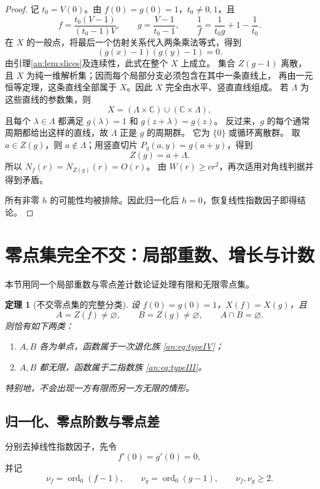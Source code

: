 \documentclass[11pt,a4paper,oneside,openany]{book}
\theoremstyle{lecture}
\newtheorem{theorem}{定理}[section]
\newcommand{\C}{\mathbb C}
\newcommand{\ord}{\operatorname{ord}}
\numberwithin{equation}{section}
\begin{document}
\begin{proof}
记 $t_0=V(0)$。由 $f(0)=g(0)=1$，$t_0\ne0,1$，且
\begin{equation}\label{an:eq:exceptionaffine}
 f=\frac{t_0(V-1)}{(t_0-1)V},\qquad
 g=\frac{V-1}{t_0-1},\qquad
 \frac1f=\frac1{t_0g}+1-\frac1{t_0}.
\end{equation}
在 $X$ 的一般点，将最后一个仿射关系代入两条乘法等式，得到
\[
 (g(x)-1)(g(y)-1)=0.
\]
由引理\ref{an:lem:slices}及连续性，此式在整个 $X$ 上成立。
集合 $Z(g-1)$ 离散，且 $X$ 为纯一维解析集；因而每个局部分支必须包含在其中一条直线上，
再由一元恒等定理，这条直线全部属于 $X$。因此 $X$ 完全由水平、竖直直线组成。
若 $\Lambda$ 为这些直线的参数集，则
\[
 X=(\Lambda\times\C)\cup(\C\times\Lambda),
\]
且每个 $\lambda\in\Lambda$ 都满足 $g(\lambda)=1$ 和 $g(z+\lambda)=g(z)$。
反过来，$g$ 的每个通常周期都给出这样的直线，故 $\Lambda$ 正是 $g$ 的周期群。
它为 $\{0\}$ 或循环离散群。
取 $a\in Z(g)$，则 $a\notin\Lambda$；用竖直切片
$P_g(a,y)=g(a+y)$，得到
\[
 Z(g)=a+\Lambda.
\]
所以 $N_f(r)=N_{Z(g)}(r)=O(r)$。
由 $W(r)\ge cr^2$，再次适用对角线判据并得到矛盾。

所有非零 $h$ 的可能性均被排除。因此归一化后 $h=0$，恢复线性指数因子即得结论。
\end{proof}

\section{零点集完全不交：局部重数、增长与计数}\label{an:sec:disjoint}
本节用同一个局部重数与零点差计数论证处理有限和无限零点集。

\begin{theorem}[不交零点集的完整分类]\label{an:thm:disjoint}
设 $f(0)=g(0)=1$，$X(f)=X(g)$，且
\[
 A=Z(f)\ne\varnothing,\qquad B=Z(g)\ne\varnothing,\qquad A\cap B=\varnothing.
\]
则恰有如下两类：
\begin{enumerate}[label=(\roman*)]
\item $A,B$ 各为单点，函数属于一次退化族 \eqref{an:eq:typeIV}；
\item $A,B$ 都无限，函数属于二指数族 \eqref{an:eq:typeIII}。
\end{enumerate}
特别地，不会出现一方有限而另一方无限的情形。
\end{theorem}

\subsection{归一化、零点阶数与零点差}
分别去掉线性指数因子，先令
\begin{equation}\label{an:eq:disjointnorm}
 f'(0)=g'(0)=0,
\end{equation}
并记
\[
 \nu_f=\ord_0(f-1),\qquad \nu_g=\ord_0(g-1),\qquad \nu_f,\nu_g\ge2.
\]
\end{document}

